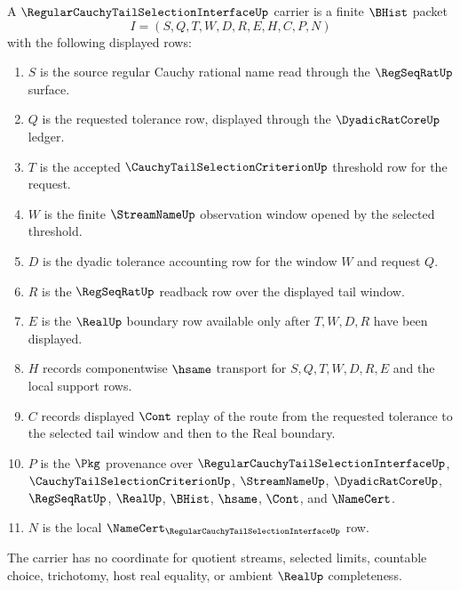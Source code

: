 \begin{definition}
\label{def:regular-cauchy-tail-selection-interface-carrier}
A $\RegularCauchyTailSelectionInterfaceUp$ carrier is a finite $\BHist$ packet
$$
I=(S,Q,T,W,D,R,E,H,C,P,N)
$$
with the following displayed rows:
\begin{enumerate}
\item $S$ is the source regular Cauchy rational name read through the $\RegSeqRatUp$ surface.
\item $Q$ is the requested tolerance row, displayed through the $\DyadicRatCoreUp$ ledger.
\item $T$ is the accepted $\CauchyTailSelectionCriterionUp$ threshold row for the request.
\item $W$ is the finite $\StreamNameUp$ observation window opened by the selected threshold.
\item $D$ is the dyadic tolerance accounting row for the window $W$ and request $Q$.
\item $R$ is the $\RegSeqRatUp$ readback row over the displayed tail window.
\item $E$ is the $\RealUp$ boundary row available only after $T,W,D,R$ have been displayed.
\item $H$ records componentwise $\hsame$ transport for $S,Q,T,W,D,R,E$ and the local support rows.
\item $C$ records displayed $\Cont$ replay of the route from the requested tolerance to the selected tail window and then to the Real boundary.
\item $P$ is the $\Pkg$ provenance over $\RegularCauchyTailSelectionInterfaceUp$, $\CauchyTailSelectionCriterionUp$, $\StreamNameUp$, $\DyadicRatCoreUp$, $\RegSeqRatUp$, $\RealUp$, $\BHist$, $\hsame$, $\Cont$, and $\NameCert$.
\item $N$ is the local $\NameCert_{\RegularCauchyTailSelectionInterfaceUp}$ row.
\end{enumerate}
The carrier has no coordinate for quotient streams, selected limits, countable choice, trichotomy, host real equality, or ambient $\RealUp$ completeness.
\end{definition}

